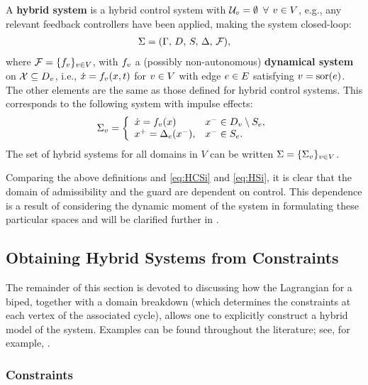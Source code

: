 \begin{definition}
  A {\bf hybrid system} is a hybrid control system with $\mathcal{U}_{v} = \emptyset$
  $\forall$ $v \in V$, e.g., any relevant feedback controllers have been
  applied, making the system closed-loop:
  \begin{align*}
    \Sigma = (\Gamma, \, D, \, S, \, \Delta, \, \mathcal{F}),
  \end{align*}
  where $\mathcal{F} = \{f_{v}\}_{v \in V}$, with $f_{v}$ a (possibly non-autonomous) {\bf
    dynamical system} on $\mathcal{X} \subseteq D_{v}$, i.e., ${\dot {x}} = f_{v}(x, t)$ for
  $v \in V$ with edge $e \in E$ satisfying $v = \mathrm{sor}(e)$.
  The other elements are the same as those defined for hybrid control systems.
  This corresponds to the following system with impulse effects:
  \begin{align}
    \label{eq:HSi}
    \Sigma_{v} = \left\{
      \begin{array}{l l}
        {\dot {x}} = f_{v}(x) & x^{-} \in D_{v} \setminus S_{e},\\
        x^{+} = \Delta_{e}(x^{-}), & x^{-} \in S_{e}.
      \end{array}\right.
  \end{align}
  The set of hybrid systems for all domains in $V$ can be written $\Sigma =
  \{\Sigma_{v}\}_{v \in V}$.
\end{definition}

Comparing the above definitions and \eqref{eq:HCSi} and \eqref{eq:HSi}, it is
clear that the domain of admissibility and the guard are dependent on control.
%
This dependence is a result of considering the dynamic moment of the system in
formulating these particular spaces and will be clarified further in
.


\subsection{Obtaining Hybrid Systems from Constraints}

The remainder of this section is devoted to discussing how the Lagrangian for a
biped, together with a domain breakdown (which determines the constraints at
each vertex of the associated cycle), allows one to explicitly construct a
hybrid model of the system.
%
Examples can be found throughout the literature; see, for example,
\cite{Grizzle2010, Grizzle2014, Sinnet2009}.


\subsubsection{Constraints}

